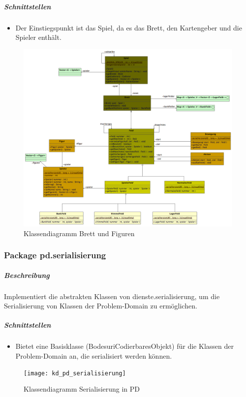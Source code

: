 \documentclass[12pt,halfparskip]{scrartcl}
\begin{document}
\subparagraph{Schnittstellen}
\begin{itemize}
	\item Der Einstiegspunkt ist das Spiel, da es das Brett, den Kartengeber und die Spieler enthält.
\end{itemize}

\label{ssub:diagramme}
\begin{figure}[h]
	\centering
	\includegraphics[width=\textwidth]{pd_brett}
	\caption{Klassendiagramm Brett und Figuren}
	\label{fig:pd_brett}
\end{figure}


\clearpage
\subsubsection{Package pd.serialisierung}

\subparagraph{Beschreibung}
Implementiert die abstrakten Klassen von dienste.serialisierung, um die Serialisierung von Klassen der Problem-Domain zu ermöglichen.

\subparagraph{Schnittstellen}
\begin{itemize}
	\item Bietet eine Basisklasse (BodesuriCodierbaresObjekt) für die Klassen der Problem-Domain an, die serialisiert werden können.
\end{itemize}

\begin{figure}[h]
	\centering
	\texttt{[image: kd\_pd\_serialisierung]}
	\caption{Klassendiagramm Serialisierung in PD}
	\label{fig:kd_pd_serialisierung}
\end{figure}
\end{document}
